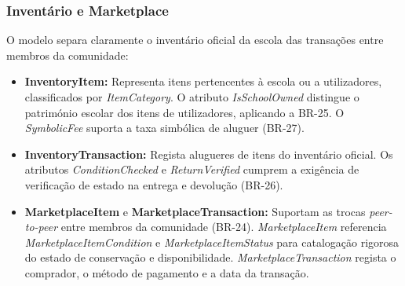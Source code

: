 \documentclass[12pt,a4paper]{report}
\begin{document}
\subsubsection{Inventário e Marketplace}
O modelo separa claramente o inventário oficial da escola das transações entre membros da comunidade:
\begin{itemize}
    \item \textbf{InventoryItem:} Representa itens pertencentes à escola ou a utilizadores, classificados por \textit{ItemCategory}. O atributo \textit{IsSchoolOwned} distingue o património escolar dos itens de utilizadores, aplicando a BR-25. O \textit{SymbolicFee} suporta a taxa simbólica de aluguer (BR-27).
    \item \textbf{InventoryTransaction:} Regista alugueres de itens do inventário oficial. Os atributos \textit{ConditionChecked} e \textit{ReturnVerified} cumprem a exigência de verificação de estado na entrega e devolução (BR-26).
    \item \textbf{MarketplaceItem} e \textbf{MarketplaceTransaction:} Suportam as trocas \textit{peer-to-peer} entre membros da comunidade (BR-24). \textit{MarketplaceItem} referencia \textit{MarketplaceItemCondition} e \textit{MarketplaceItemStatus} para catalogação rigorosa do estado de conservação e disponibilidade. \textit{MarketplaceTransaction} regista o comprador, o método de pagamento e a data da transação.
\end{itemize}
\end{document}
